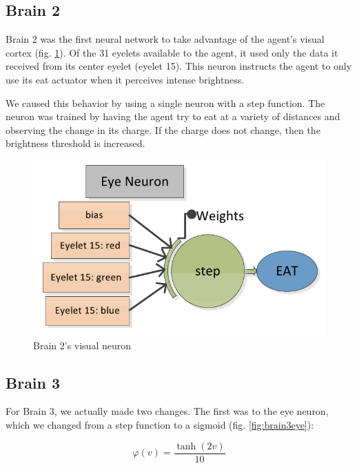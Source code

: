 \subsection{Brain 2}

Brain 2 was the first neural network to take advantage of the agent's visual
cortex (fig. \ref{fig:brain2}). Of the 31 eyelets available to the agent, it 
used only the data it received from its center eyelet (eyelet 15). This
neuron instructs the agent to only use its eat actuator when it perceives
intense brightness. 

We caused this behavior by using a single neuron with a step function. 
The neuron was trained by having the agent try to eat at a variety of 
distances and observing the change in its charge. If the charge does not
change, then the brightness threshold is increased.

\begin{figure}
\begin{center}
  \includegraphics[scale=.3]{img/brain2.png}
  \caption{Brain 2's visual neuron}
  \label{fig:brain2}
\end{center}
\end{figure}

\subsection{Brain 3}

For Brain 3, we actually made two changes. The first was to the
eye neuron, which we changed from a step function to a sigmoid 
(fig. \ref{fig:brain3eye}):

\begin{equation} \label{eq:eyesig}
  \varphi(v) = \frac{\tanh(2v)}{10}
\end{equation}

